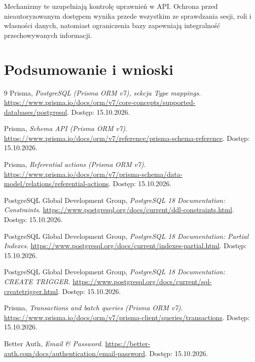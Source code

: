 \documentclass[11pt, a4paper]{article}
\begin{document}
Mechanizmy te uzupełniają kontrolę uprawnień w API. Ochrona przed nieautoryzowanym dostępem wynika przede wszystkim ze sprawdzania sesji, roli i własności danych, natomiast ograniczenia bazy zapewniają integralność przechowywanych informacji.


\section{Podsumowanie i wnioski}

\newpage

{}
\begin{thebibliography}{9}
Prisma, \textit{PostgreSQL (Prisma ORM v7), sekcja Type mappings}.
\url{https://www.prisma.io/docs/orm/v7/core-concepts/supported-databases/postgresql}. Dostęp: 15.10.2026.

Prisma, \textit{Schema API (Prisma ORM v7)}.
\url{https://www.prisma.io/docs/orm/v7/reference/prisma-schema-reference}. Dostęp: 15.10.2026.

Prisma, \textit{Referential actions (Prisma ORM v7)}.
\url{https://www.prisma.io/docs/orm/v7/prisma-schema/data-model/relations/referential-actions}. Dostęp: 15.10.2026.

PostgreSQL Global Development Group, \textit{PostgreSQL 18 Documentation: Constraints}.
\url{https://www.postgresql.org/docs/current/ddl-constraints.html}. Dostęp: 15.10.2026.

PostgreSQL Global Development Group, \textit{PostgreSQL 18 Documentation: Partial Indexes}.
\url{https://www.postgresql.org/docs/current/indexes-partial.html}. Dostęp: 15.10.2026.

PostgreSQL Global Development Group, \textit{PostgreSQL 18 Documentation: CREATE TRIGGER}.
\url{https://www.postgresql.org/docs/current/sql-createtrigger.html}. Dostęp: 15.10.2026.

Prisma, \textit{Transactions and batch queries (Prisma ORM v7)}.
\url{https://www.prisma.io/docs/orm/v7/prisma-client/queries/transactions}. Dostęp: 15.10.2026.

Better Auth, \textit{Email \& Password}.
\url{https://better-auth.com/docs/authentication/email-password}. Dostęp: 15.10.2026.
\end{thebibliography}

{}
\listoffigures

{}
\listoftables
\end{document}
